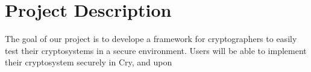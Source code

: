 \section{Project Description}

The goal of our project is to develope a framework for cryptographers to easily test their
cryptosystems in a secure environment. Users will be able to implement their cryptosystem securely
in Cry, and upon

